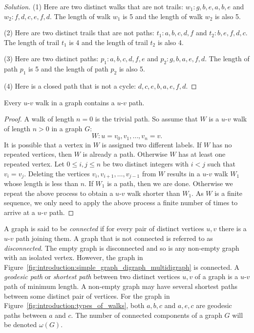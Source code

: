 \begin{proof}[Solution]
(1) Here are two distinct walks that are not trails:
$w_1: g, b, e, a, b, e$ and $w_2: f, d, c, e, f, d$. The length of
walk $w_1$ is 5 and the length of walk $w_2$ is also 5.

(2) Here are two distinct trails that are not paths:
$t_1: a, b, c, d, f$ and $t_2: b, e, f, d, c$. The length of trail
$t_1$ is 4 and the length of trail $t_2$ is also 4.

(3) Here are two distinct paths: $p_1: a, b, c, d, f, e$ and
$p_2: g, b, a, e, f, d$. The length of path $p_1$ is 5 and the length
of path $p_2$ is also 5.

(4) Here is a closed path that is not a cycle: $d, c, e, b, a, e, f, d$.
\end{proof}

\begin{theorem}
Every $u$-$v$ walk in a graph contains a $u$-$v$ path.
\end{theorem}

\begin{proof}
A walk of length $n = 0$ is the trivial path. So assume that $W$ is a
$u$-$v$ walk of length $n > 0$ in a graph $G$:
\[
W: u = v_0, v_1, \dots, v_n = v.
\]
It is possible that a vertex in $W$ is assigned two different
labels. If $W$ has no repeated vertices, then $W$ is already a
path. Otherwise $W$ has at least one repeated vertex. Let
$0 \leq i,j \leq n$ be two distinct integers with $i < j$ such that
$v_i = v_j$. Deleting the vertices $v_i, v_{i+1}, \dots, v_{j-1}$ from
$W$ results in a $u$-$v$ walk $W_1$ whose length is less than $n$. If
$W_1$ is a path, then we are done. Otherwise we repeat the above
process to obtain a $u$-$v$ walk shorter than $W_1$. As $W$ is a
finite sequence, we only need to apply the above process a finite
number of times to arrive at a $u$-$v$ path.
\end{proof}

A graph is said to be \emph{connected} if for every pair of distinct
vertices $u, v$ there is a $u$-$v$ path joining them. A graph that is
not connected is referred to as \emph{disconnected}. The empty graph
is disconnected and so is any non-empty graph with an isolated
vertex. However, the graph in
Figure~\ref{fig:introduction:simple_graph_digraph_multidigraph} is
connected. A \emph{geodesic path} or \emph{shortest path} between two
distinct vertices $u,v$ of a graph is a $u$-$v$ path of minimum
length. A non-empty graph may have several shortest paths between some
distinct pair of vertices. For the graph in
Figure~\ref{fig:introduction:types_of_walks}, both $a,b,c$ and $a,e,c$
are geodesic paths between $a$ and $c$. The number of connected
components of a graph $G$ will be denoted $\omega(G)$.
\index{$\omega$}

